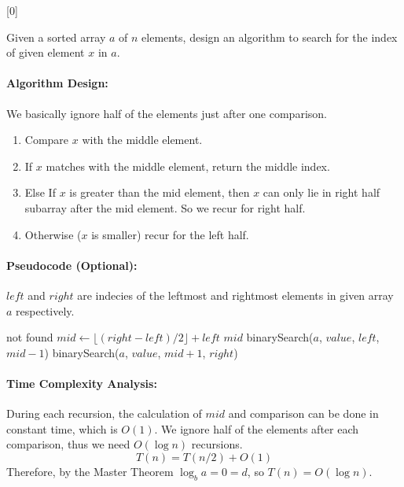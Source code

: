 [0]

Given a sorted array $a$ of $n$ elements, design an algorithm to search for the index of given element $x$ in $a$.

\begin{solution}

\paragraph{Algorithm Design:} We basically ignore half of the elements just after one comparison.
\begin{enumerate}
	\item Compare $x$ with the middle element.
	\item If $x$ matches with the middle element, return the middle index.
	\item Else If $x$ is greater than the mid element, then $x$ can only lie in right half subarray after the mid element. So we recur for right half.
	\item Otherwise ($x$ is smaller) recur for the left half.
\end{enumerate}

\paragraph{Pseudocode (Optional):}
$left$ and $right$ are indecies of the leftmost and rightmost elements in given array $a$ respectively.
\begin{algorithm}[H]
	\begin{algorithmic}[1]
		\State \Return not found
		\EndIf
		\State $mid\gets \lfloor (right-left)/2 \rfloor + left$
		\State \Return $mid$
		\EndIf
		\State \Return binarySearch($a$, $value$, $left$, $mid-1$)
		\Else
		\State \Return binarySearch($a$, $value$, $mid+1$, $right$) 
		\EndIf   		
		\EndFunction
	\end{algorithmic}
\end{algorithm}

\paragraph{Time Complexity Analysis:}
During each recursion, the calculation of $mid$ and comparison can be done in constant time, which is $O(1)$. We ignore half of the elements after each comparison, thus we need $O(\log n)$ recursions.
$$T(n) = T(n/2)+O(1)$$
Therefore, by the Master Theorem $\log_{b}{a}=0=d$, so $T(n) = O(\log n)$.

\end{solution}